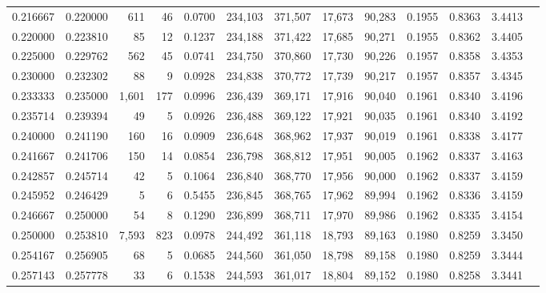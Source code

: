 \begin{tabular}{rrrrrrrrrrrrr}
0.216667 & 0.220000 &    611 &     46 &                                     0.0700 & 234,103 & 371,507 &  17,673 &  90,283 & 0.1955 & 0.8363 & 3.4413 \\
0.220000 & 0.223810 &     85 &     12 &                                     0.1237 & 234,188 & 371,422 &  17,685 &  90,271 & 0.1955 & 0.8362 & 3.4405 \\
0.225000 & 0.229762 &    562 &     45 &                                     0.0741 & 234,750 & 370,860 &  17,730 &  90,226 & 0.1957 & 0.8358 & 3.4353 \\
0.230000 & 0.232302 &     88 &      9 &                                     0.0928 & 234,838 & 370,772 &  17,739 &  90,217 & 0.1957 & 0.8357 & 3.4345 \\
0.233333 & 0.235000 &  1,601 &    177 &                                     0.0996 & 236,439 & 369,171 &  17,916 &  90,040 & 0.1961 & 0.8340 & 3.4196 \\
0.235714 & 0.239394 &     49 &      5 &                                     0.0926 & 236,488 & 369,122 &  17,921 &  90,035 & 0.1961 & 0.8340 & 3.4192 \\
0.240000 & 0.241190 &    160 &     16 &                                     0.0909 & 236,648 & 368,962 &  17,937 &  90,019 & 0.1961 & 0.8338 & 3.4177 \\
0.241667 & 0.241706 &    150 &     14 &                                     0.0854 & 236,798 & 368,812 &  17,951 &  90,005 & 0.1962 & 0.8337 & 3.4163 \\
0.242857 & 0.245714 &     42 &      5 &                                     0.1064 & 236,840 & 368,770 &  17,956 &  90,000 & 0.1962 & 0.8337 & 3.4159 \\
0.245952 & 0.246429 &      5 &      6 &                                     0.5455 & 236,845 & 368,765 &  17,962 &  89,994 & 0.1962 & 0.8336 & 3.4159 \\
0.246667 & 0.250000 &     54 &      8 &                                     0.1290 & 236,899 & 368,711 &  17,970 &  89,986 & 0.1962 & 0.8335 & 3.4154 \\
0.250000 & 0.253810 &  7,593 &    823 &                                     0.0978 & 244,492 & 361,118 &  18,793 &  89,163 & 0.1980 & 0.8259 & 3.3450 \\
0.254167 & 0.256905 &     68 &      5 &                                     0.0685 & 244,560 & 361,050 &  18,798 &  89,158 & 0.1980 & 0.8259 & 3.3444 \\
0.257143 & 0.257778 &     33 &      6 &                                     0.1538 & 244,593 & 361,017 &  18,804 &  89,152 & 0.1980 & 0.8258 & 3.3441 \\

\end{tabular}
